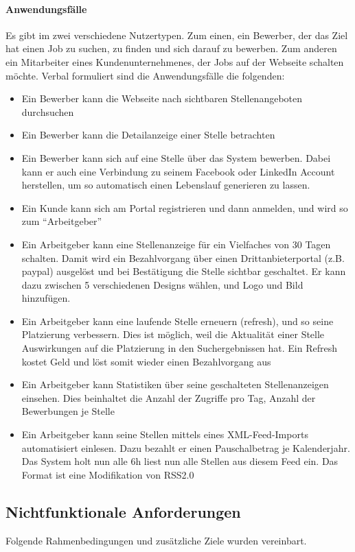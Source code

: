 \paragraph{Anwendungsfälle}
Es gibt im zwei verschiedene Nutzertypen. Zum einen, ein Bewerber, der das Ziel hat einen Job zu suchen, zu finden und sich darauf zu bewerben. Zum anderen ein Mitarbeiter eines Kundenunternehmenes, der Jobs auf der Webseite schalten möchte.
Verbal formuliert sind die Anwendungsfälle die folgenden:
\begin{itemize}
 \item Ein Bewerber kann die Webseite nach sichtbaren Stellenangeboten durchsuchen
 \item Ein Bewerber kann die Detailanzeige einer Stelle betrachten
 \item Ein Bewerber kann sich auf eine Stelle über das System bewerben. Dabei kann er auch eine Verbindung zu seinem Facebook oder LinkedIn Account herstellen, um so automatisch einen Lebenslauf generieren zu lassen.
 \item Ein Kunde kann sich am Portal registrieren und dann anmelden, und wird so zum "`Arbeitgeber"'
 \item Ein Arbeitgeber kann eine Stellenanzeige für ein Vielfaches von 30 Tagen schalten. Damit wird ein Bezahlvorgang über einen Drittanbieterportal (z.B. paypal) ausgelöst und bei Bestätigung die Stelle sichtbar geschaltet. Er kann dazu zwischen 5 verschiedenen Designs wählen, und Logo und Bild hinzufügen. 
 \item Ein Arbeitgeber kann eine laufende Stelle erneuern (refresh), und so seine Platzierung verbessern. Dies ist möglich, weil die Aktualität einer Stelle Auswirkungen auf die Platzierung in den Suchergebnissen hat. Ein Refresh kostet Geld und löst somit wieder einen Bezahlvorgang aus
 \item Ein Arbeitgeber kann Statistiken über seine geschalteten Stellenanzeigen einsehen. Dies beinhaltet die Anzahl der Zugriffe pro Tag, Anzahl der Bewerbungen je Stelle
 \item Ein Arbeitgeber kann seine Stellen mittels eines XML-Feed-Imports automatisiert einlesen. Dazu bezahlt er einen Pauschalbetrag je Kalenderjahr. Das System holt nun alle 6h liest nun alle Stellen aus diesem Feed ein. Das Format ist eine Modifikation von RSS2.0  
\end{itemize}



\subsection{Nichtfunktionale Anforderungen}
Folgende Rahmenbedingungen und zusätzliche Ziele wurden vereinbart.

